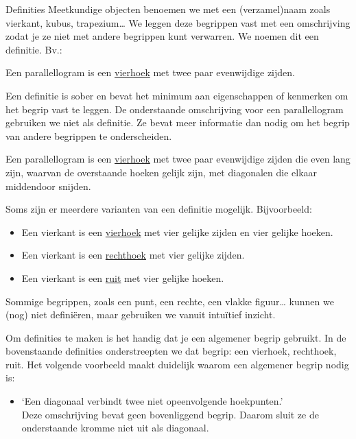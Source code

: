 \begin{lesactiviteit}{Definities}
Meetkundige objecten benoemen we met een (verzamel)naam zoals vierkant, kubus, trapezium\ldots{}
We leggen deze begrippen vast met een omschrijving zodat je ze niet met andere begrippen kunt verwarren.
We noemen dit een definitie.
Bv.:
\begin{citaat}
    Een parallellogram is een \underline{vierhoek} met twee paar evenwijdige zijden.
\end{citaat}

Een definitie is sober en bevat het minimum aan eigenschappen of kenmerken om het begrip vast te leggen.
De onderstaande omschrijving voor een parallellogram gebruiken we niet als definitie.
Ze bevat meer informatie dan nodig om het begrip van andere begrippen te
onderscheiden.
\begin{citaat}
    Een parallellogram is een \underline{vierhoek} met twee paar evenwijdige zijden die even lang zijn, waarvan de overstaande hoeken gelijk zijn, met diagonalen die elkaar middendoor snijden.
\end{citaat}

Soms zijn er meerdere varianten van een definitie mogelijk.
Bijvoorbeeld:
\begin{itemize}
\item Een vierkant is een \underline{vierhoek} met vier gelijke zijden en vier gelijke hoeken.
\item Een vierkant is een \underline{rechthoek} met vier gelijke zijden.
\item Een vierkant is een \underline{ruit} met vier gelijke hoeken.
\end{itemize}

Sommige begrippen, zoals een punt, een rechte, een vlakke figuur\ldots{} kunnen we (nog) niet definiëren, maar gebruiken we vanuit intuïtief inzicht.

Om definities te maken is het handig dat je een algemener begrip gebruikt.
In de bovenstaande definities onderstreepten we dat begrip: een vierhoek, rechthoek, ruit.
Het volgende voorbeeld maakt duidelijk waarom een algemener begrip nodig is:
\begin{itemize}
\item `Een diagonaal verbindt twee niet opeenvolgende hoekpunten.'\\
  Deze omschrijving bevat geen bovenliggend begrip.
  Daarom sluit ze de onderstaande kromme niet uit als diagonaal.


\end{itemize}
\end{lesactiviteit}
